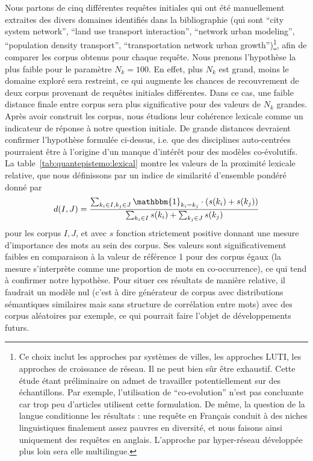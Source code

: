 {}{
Nous partons de cinq différentes requêtes initiales qui ont été manuellement extraites des divers domaines identifiés dans la bibliographie (qui sont ``city system network'', ``land use transport interaction'', ``network urban modeling'', ``population density transport'', ``transportation network urban growth'')\footnote{Ce choix inclut les approches par systèmes de villes, les approches LUTI, les approches de croissance de réseau. Il ne peut bien sûr être exhaustif. Cette étude étant préliminaire on admet de travailler potentiellement sur des échantillons. Par exemple, l'utilisation de ``co-evolution'' n'est pas concluante car trop peu d'articles utilisent cette formulation. De même, la question de la langue conditionne les résultats : une requête en Français conduit à des niches linguistiques finalement assez pauvres en diversité, et nous faisons ainsi uniquement des requêtes en anglais. L'approche par hyper-réseau développée plus loin sera elle multilingue.}, afin de comparer les corpus obtenus pour chaque requête. Nous prenons l'hypothèse la plus faible pour le paramètre $N_k=100$. En effet, plus $N_k$ est grand, moins le domaine exploré sera restreint, ce qui augmente les chances de recouvrement de deux corpus provenant de requêtes initiales différentes. Dans ce cas, une faible distance finale entre corpus sera plus significative pour des valeurs de $N_k$ grandes. Après avoir construit les corpus, nous étudions leur cohérence lexicale comme un indicateur de réponse à notre question initiale. De grande distances devraient confirmer l'hypothèse formulée ci-dessus, i.e. que des disciplines auto-centrées pourraient être à l'origine d'un manque d'intérêt pour des modèles co-évolutifs. La table~\ref{tab:quantepistemo:lexical} montre les valeurs de la proximité lexicale relative, que nous définissons par un indice de similarité d'ensemble pondéré donné par
\[
d(I,J) = \frac{\sum_{k_i \in I, k_j \in J} \mathbbm{1}_{k_i = k_j} \cdot (s(k_i) + s(k_j))}{\sum_{k_i \in I} s(k_i) + \sum_{k_j \in J} s(k_j)}
\]
pour les corpus $I,J$, et avec $s$ fonction strictement positive donnant une mesure d'importance des mots au sein des corpus. Ses valeurs sont significativement faibles en comparaison à la valeur de référence 1 pour des corpus égaux (la mesure s'interprète comme une proportion de mots en co-occurrence), ce qui tend à confirmer notre hypothèse. Pour situer ces résultats de manière relative, il faudrait un modèle nul (c'est à dire générateur de corpus avec distributions sémantiques similaires mais sans structure de corrélation entre mots) avec des corpus aléatoires par exemple, ce qui pourrait faire l'objet de développements futurs. 
}

